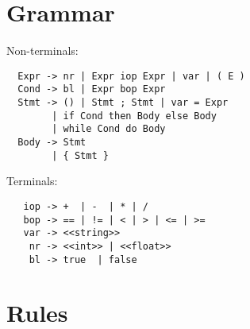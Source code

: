 \documentclass[11pt]{report}
\begin{document}
\thispagestyle{empty}
\section*{Grammar}

Non-terminals:
  \begin{lstlisting}
  Expr -> nr | Expr iop Expr | var | ( E )
  Cond -> bl | Expr bop Expr 
  Stmt -> () | Stmt ; Stmt | var = Expr
        | if Cond then Body else Body
        | while Cond do Body
  Body -> Stmt
        | { Stmt }
  \end{lstlisting}

\vspace{3em}
\noindent Terminals:
    \begin{lstlisting}
   iop -> +  | -  | * | / 
   bop -> == | != | < | > | <= | >=
   var -> <<string>>
    nr -> <<int>> | <<float>>
    bl -> true  | false
  \end{lstlisting}





\newpage
\thispagestyle{empty} %
\section*{Rules}
\end{document}
